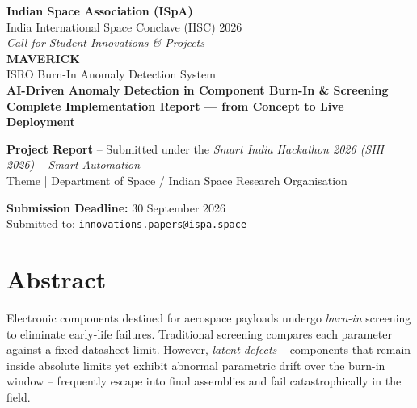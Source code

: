 \documentclass[11pt,a4paper]{article}
\begin{document}
\begin{titlepage}
  \centering
  \vspace*{1.5cm}

  {\Large\textcolor{isroorange}{\textbf{Indian Space Association (ISpA)}}}\\[0.3cm]
  {\large India International Space Conclave (IISC) 2026}\\[0.3cm]
  {\large \textit{Call for Student Innovations \& Projects}}\\[2.2cm]

  {\Huge\bfseries\color{isroblue} MAVERICK}\\[0.8cm]
  {\LARGE ISRO Burn-In Anomaly Detection System}\\[0.5cm]
  {\large \textbf{AI-Driven Anomaly Detection in Component Burn-In \& Screening}}\\[1.6cm]

  {\large\textbf{Complete Implementation Report --- from Concept to Live Deployment}}\\[1.6cm]

  \begin{infobox}
    \centering
    \textbf{Project Report} -- Submitted under the
    \textit{Smart India Hackathon 2026 (SIH 2026) -- Smart Automation}\\
    Theme | Department of Space / Indian Space Research Organisation
  \end{infobox}

  \vfill
  {\large \textbf{Submission Deadline:} 30 September 2026}\\[0.4cm]
  {\large Submitted to: \texttt{innovations.papers@ispa.space}}
\end{titlepage}

\clearpage
\tableofcontents
\clearpage

\section*{Abstract}

Electronic components destined for aerospace payloads undergo \emph{burn-in} screening to
eliminate early-life failures. Traditional screening compares each parameter against a fixed
datasheet limit. However, \emph{latent defects} -- components that remain inside absolute
limits yet exhibit abnormal parametric drift over the burn-in window -- frequently escape into
final assemblies and fail catastrophically in the field.
\end{document}
